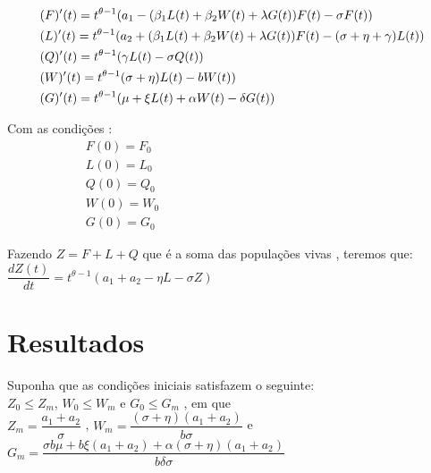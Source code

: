 \documentclass[12pt,a4paper]{article}
\begin{document}
\begin{align}
    
    & (F)'(t) = t^{\theta-1}(a_1 - (\beta_1 L(t) + \beta_2 W(t) + \lambda G(t)) F(t) - \sigma F(t)) \vspace{2mm} \\
    
    & (L)'(t) = t^{\theta-1} (a_2 + (\beta_1 L(t) + \beta_2 W(t) + \lambda G(t)) F(t) - (\sigma + \eta + \gamma) L(t))\vspace{2mm}\\
    
    & (Q)'(t) = t^{\theta-1} (\gamma L(t) - \sigma Q(t))\vspace{2mm}\\
    
    & (W)'(t) = t^{\theta-1} (\sigma + \eta) L(t) - bW(t))\vspace{2mm}\\
    
    & (G)'(t) = t^{\theta-1} (\mu + \xi L(t) + \alpha W(t) - \delta G(t))
\end{align}

\noindent Com as condições :\\
\begin{align*}
    F(0) = F_0 & & & & & & & & & & & & & & & & & & & & & &\\
    L(0) = L_0 \\
    Q(0) = Q_0 \\
    W(0) = W_0 \\
    G(0) = G_0
\end{align*}

\vspace{4mm}
Fazendo $Z = F + L + Q$ que é a soma das populações vivas , teremos que:\vspace{2mm}\\
$\dfrac{d Z(t)}{dt} = t^{\theta - 1}(a_1 + a_2 - \eta L - \sigma Z)$

\section*{Resultados}

Suponha que as condições iniciais satisfazem o seguinte:\\
$Z_0 \leq Z_m$, $W_0 \leq W_m$ e $G_0 \leq G_m$ , em que \vspace{2mm}\\
$Z_m = \dfrac{a_1 + a_2}{\sigma}$ , $W_m = \dfrac{(\sigma + \eta)(a_1 + a_2)}{b\sigma}$ e $G_m = \dfrac{\sigma b \mu + b\xi(a_1 + a_2) + \alpha(\sigma + \eta)(a_1 + a_2)} {b \delta \sigma}$
\end{document}
